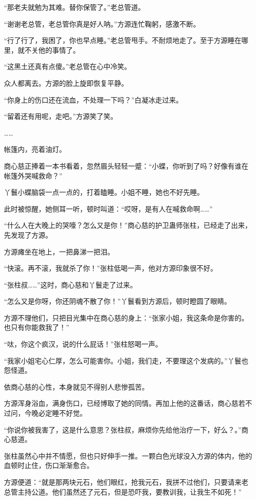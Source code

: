 \begin{this_body}
“那老夫就勉为其难。替你保管了。”老总管道。

“谢谢老总管，老总管你真是好人呐。”方源连忙鞠躬，感激不断。

“行了行了，我困了，你也早点睡。”老总管甩手。不耐烦地走了。至于方源睡在哪里，就不关他的事情了。

“这黑土还真有点傻。”老总管在心中冷笑。

众人都离去。方源的脸上旋即恢复平静。

“你身上的伤口还在流血，不处理一下吗？”白凝冰走过来。

“留着还有用呢，走吧。”方源笑了笑。

……

帐篷内，亮着油灯。

商心慈正捧着一本书看着，忽然眉头轻轻一蹙：“小蝶，你听到了吗？好像有谁在帐篷外哭喊救命？”

丫鬟小蝶脑袋一点一点的，打着瞌睡。小姐不睡，她也不好先睡。

此时被惊醒，她侧耳一听，顿时叫道：“哎呀，是有人在喊救命啊……”

“什么人在大晚上的哭嚎？怎么又是你！”商心慈的护卫蛊师张柱，已经走了出来，先发现了方源。

方源瘫坐在地上，一把鼻涕一把泪。

“快滚。再不滚，我就杀了你！”张柱低喝一声，他对方源印象很不好。

“张柱叔……”这时，商心慈和丫鬟走了过来。

“怎么又是你呀，你还阴魂不散了你！”丫鬟看到方源后，顿时瞪圆了眼睛。

方源不理他们，只把目光集中在商心慈的身上：“张家小姐，我这条命是你害的。也只有你能救我了！”

“呔，你这个疯汉，说的什么屁话！”张柱怒喝一声。

“我家小姐宅心仁厚，怎么可能害你。小姐，我们走，不要理这个发病的。”丫鬟也怨怪道。

依商心慈的心性，本身就见不得别人悲惨孤苦。

方源浑身浴血，满身伤口，已经博取了她的同情。再加上他的这番话，商心慈若不过问，今晚必定睡不好觉。

“你说你被我害了，这是什么意思？张柱叔，麻烦你先给他治疗一下，好么？。”商心慈道。

张柱虽然心中并不情愿，但也只好伸手一推。一颗白色光球没入方源的体内，他的血顿时止住，伤口渐渐愈合。

方源便道：“就是那两块元石，他们眼红，抢我元石，我拼不过他们，只要请来老总管主持公道。他们虽然还了元石，但是恐吓我，要教训我，让我生不如死！”


\end{this_body}
